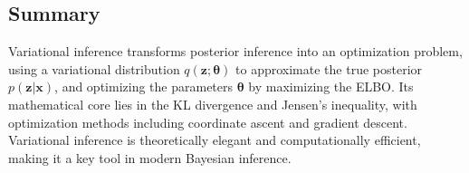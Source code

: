 \documentclass[10pt]{elegantbook}
\begin{document}
\subsection{Summary}

Variational inference transforms posterior inference into an optimization problem, using a variational distribution \( q(\mathbf{z}; \boldsymbol{\theta}) \) to approximate the true posterior \( p(\mathbf{z} | \mathbf{x}) \), and optimizing the parameters \( \boldsymbol{\theta} \) 
by maximizing the ELBO. Its mathematical core lies in the KL divergence and Jensen's inequality, with optimization methods including coordinate ascent and gradient descent. Variational inference is theoretically elegant and computationally efficient, making it a key tool in modern Bayesian inference.
\end{document}
